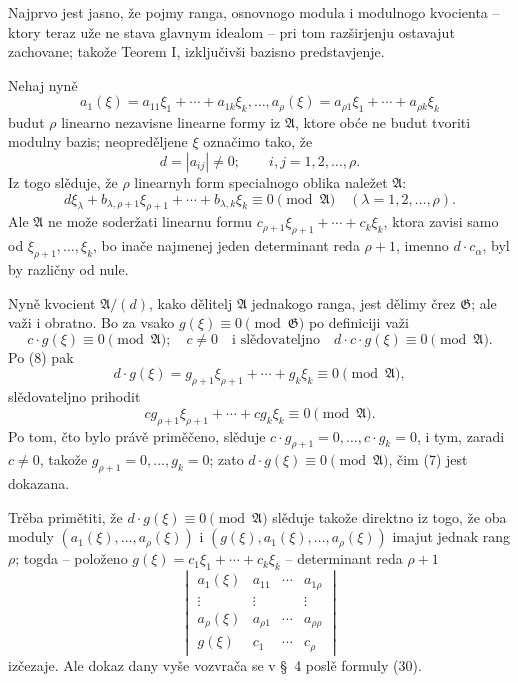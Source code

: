\documentclass[11pt]{article}
\providecommand{\Amod}{\mathfrak A}
\providecommand{\Gmod}{\mathfrak G}
\providecommand{\zero}[1]{\equiv 0\pmod{#1}}
\begin{document}
Najprvo jest jasno, že pojmy ranga, osnovnogo modula i modulnogo kvocienta -- ktory teraz uže ne stava glavnym idealom -- pri tom razširjenju ostavajut zachovane; takože Teorem I, izključivši bazisno predstavjenje.

Nehaj nyně
\[
 a_1(\xi)=a_{11}\xi_1+\cdots+a_{1k}\xi_k,\ldots,
 a_\rho(\xi)=a_{\rho1}\xi_1+\cdots+a_{\rho k}\xi_k
\]
budut $\rho$ linearno nezavisne linearne formy iz $\Amod$, ktore obće ne budut tvoriti modulny bazis; neopreděljene $\xi$ označimo tako, že
\[
 d=|a_{ij}|\ne0;\qquad i,j=1,2,\ldots,\rho.
\]
Iz togo slěduje, že $\rho$ linearnyh form specialnogo oblika naležet $\Amod$:
\begin{equation}
 d\xi_\lambda+b_{\lambda,\rho+1}\xi_{\rho+1}+\cdots+b_{\lambda,k}\xi_k\zero{\Amod}
 \quad(\lambda=1,2,\ldots,\rho).
\tag{8}
\end{equation}
Ale $\Amod$ ne može soderžati linearnu formu $c_{\rho+1}\xi_{\rho+1}+\cdots+c_k\xi_k$, ktora zavisi samo od $\xi_{\rho+1},\ldots,\xi_k$, bo inače najmenej jeden determinant reda $\rho+1$, imenno $d\cdot c_\alpha$, byl by različny od nule.

Nyně kvocient $\Amod/(d)$, kako dělitelj $\Amod$ jednakogo ranga, jest dělimy črez $\Gmod$; ale važi i obratno. Bo za vsako $g(\xi)\zero{\Gmod}$ po definiciji važi
\[
 c\cdot g(\xi)\zero{\Amod};\quad c\ne0
 \quad\text{i slědovateljno}\quad d\cdot c\cdot g(\xi)\zero{\Amod}.
\]
Po (8) pak
\[
 d\cdot g(\xi)=g_{\rho+1}\xi_{\rho+1}+\cdots+g_k\xi_k\zero{\Amod},
\]
slědovateljno prihodit
\[
 c g_{\rho+1}\xi_{\rho+1}+\cdots+c g_k\xi_k\zero{\Amod}.
\]
Po tom, čto bylo právě priměčeno, slěduje $c\cdot g_{\rho+1}=0,\ldots,c\cdot g_k=0$, i tym, zaradi $c\ne0$, takože $g_{\rho+1}=0,\ldots,g_k=0$; zato $d\cdot g(\xi)\zero{\Amod}$, čim (7) jest dokazana.

Trěba primětiti, že $d\cdot g(\xi)\zero{\Amod}$ slěduje takože direktno iz togo, že oba moduly $(a_1(\xi),\ldots,a_\rho(\xi))$ i $(g(\xi),a_1(\xi),\ldots,a_\rho(\xi))$ imajut jednak rang $\rho$; togda -- položeno $g(\xi)=c_1\xi_1+\cdots+c_k\xi_k$ -- determinant reda $\rho+1$
\[
\begin{vmatrix}
 a_1(\xi)&a_{11}&\cdots&a_{1\rho}\\
 \vdots&\vdots&&\vdots\\
 a_\rho(\xi)&a_{\rho1}&\cdots&a_{\rho\rho}\\
 g(\xi)&c_1&\cdots&c_\rho
\end{vmatrix}
\]
izčezaje. Ale dokaz dany vyše vozvrača se v §~4 poslě formuly (30).
\end{document}
